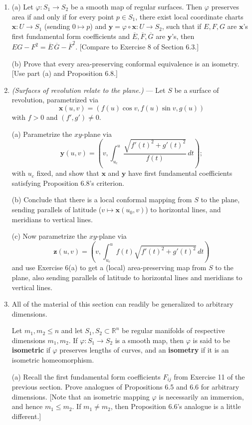\documentclass[leqno]{book}
\begin{document}
\begin{enumerate}
\item (a) Let $\varphi:S_1\to S_2$ be a smooth map of regular surfaces.  Then $\varphi$ preserves area if and only if for every point $p\in S_1$, there exist local coordinate charts $\mathbf x:U\to S_1$ (sending $0\mapsto p$) and $\mathbf y=\varphi\circ\mathbf x:U\to S_2$, such that if $E,F,G$ are $\mathbf x$'s first fundamental form coefficients and $\overline E,\overline F,\overline G$ are $\mathbf y$'s, then $EG-F^2=\overline E\,\overline G-\overline F^2$.  [Compare to Exercise 8 of Section 6.3.]

(b) Prove that every area-preserving conformal equivalence is an isometry.  [Use part (a) and Proposition 6.8.]

\item\emph{(Surfaces of revolution relate to the plane.)} \---- Let $S$ be a surface of revolution, parametrized via
$$\mathbf x(u,v)=(f(u)\cos v,f(u)\sin v,g(u))$$
with $f>0$ and $(f',g')\ne 0$.

(a) Parametrize the $xy$-plane via
$$\mathbf y(u,v)=\left(v,\int_{u_c}^u\frac{\sqrt{f'(t)^2+g'(t)^2}}{f(t)}\,dt\right);$$
with $u_c$ fixed, and show that $\mathbf x$ and $\mathbf y$ have first fundamental coefficients satisfying Proposition 6.8's criterion.

(b) Conclude that there is a local conformal mapping from $S$ to the plane, sending parallels of latitude ($v\mapsto\mathbf x(u_0,v)$) to horizontal lines, and meridians to vertical lines.

(c) Now parametrize the $xy$-plane via
$$\mathbf z(u,v)=\left(v,\int_{u_c}^uf(t)\sqrt{f'(t)^2+g'(t)^2}\,dt\right)$$
and use Exercise 6(a) to get a (local) area-preserving map from $S$ to the plane, also sending parallels of latitude to horizontal lines and meridians to vertical lines.

\item All of the material of this section can readily be generalized to arbitrary dimensions.

Let $m_1,m_2\leqslant n$ and let $S_1,S_2\subset\mathbb R^n$ be regular manifolds of respective dimensions $m_1,m_2$.  If $\varphi:S_1\to S_2$ is a smooth map, then $\varphi$ is said to be \textbf{isometric} if $\varphi$ preserves lengths of curves, and an \textbf{isometry} if it is an isometric homeomorphism.

(a) Recall the first fundamental form coefficients $F_{ij}$ from Exercise 11 of the previous section.  Prove analogues of Propositions 6.5 and 6.6 for arbitrary dimensions.  [Note that an isometric mapping $\varphi$ is necessarily an immersion, and hence $m_1\leqslant m_2$.  If $m_1\ne m_2$, then Proposition 6.6's analogue is a little different.]


\end{enumerate}
\end{document}
